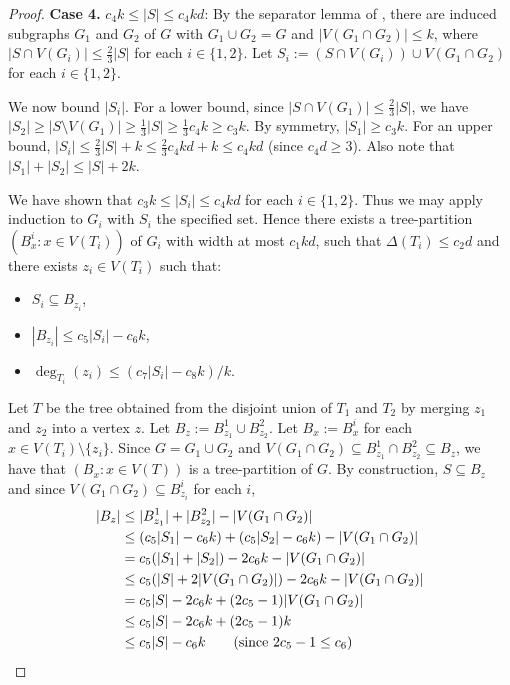 \begin{proof}
\textbf{Case 4.} $c_4 k \leq |S|\leq c_4kd$: By the separator lemma of \citet[(2.6)]{RS-II}, there are induced subgraphs $G_1$ and $G_2$ of $G$ with $G_1\cup G_2=G$ and $|V(G_1\cap G_2)|\leq k$, where $|S\cap V(G_i)|\leq \frac23 |S|$ for each $i\in\{1,2\}$. Let $S_i := (S\cap V(G_i))\cup V(G_1\cap G_2)$ for each $i\in\{1,2\}$.

We now bound $|S_i|$. For a lower bound, since $|S\cap V(G_1)|\leq \frac23 |S|$, we have $|S_2|\geq |S\setminus V(G_1)|\geq \frac13 |S| \geq \frac13 c_4k \geq c_3k $. By symmetry, $|S_1|\geq  c_3k $. For an upper bound, $|S_i|\leq\frac23 |S| + k \leq \frac23 c_4kd + k \leq c_4kd$ (since $c_4d\geq 3$). Also note that $|S_1|+|S_2|\leq |S|+2k$.

We have shown that $c_3k \leq |S_i|\leq c_4kd$ for each $i\in\{1,2\}$. Thus we may apply induction to $G_i$ with $S_i$ the specified set. Hence there exists a tree-partition $(B^i_x:x\in V(T_i))$ of $G_i$ with width at most $c_1 kd$, such that $\Delta(T_i)\leq c_2d$ and there exists $z_i\in V(T_i)$ such that:
\begin{itemize}
    \item $S_i\subseteq B_{z_i}$, 
    \item $|B_{z_i}|\leq c_5|S_i|-c_6k$,
    \item $\deg_{T_i}(z_i)\leq ( c_7 |S_i| - c_8 k)/k$.
\end{itemize}
Let $T$ be the tree obtained from the disjoint union of $T_1$ and $T_2$ by merging $z_1$ and $z_2$ into a vertex $z$. Let $B_z:= B^1_{z_1}\cup B^2_{z_2}$. Let $B_x:= B^i_x$ for each $x\in V(T_i)\setminus\{z_i\}$. Since $G=G_1\cup G_2$ and $V(G_1\cap G_2)\subseteq B^1_{z_1}\cap B^2_{z_2} \subseteq B_z$, we have that $(B_x:x\in V(T))$ is a tree-partition of $G$. 
By construction, $S\subseteq B_z$ and since $V(G_1\cap G_2)\subseteq B^i_{z_i}$ for each $i$, 
\begin{align*}
    |B_z| 
    & \leq |B^1_{z_1}|+|B^2_{z_2}| - |V(G_1\cap G_2)|\\
    & \leq (c_5|S_1|-c_6k) +  (c_5|S_2|-c_6k) - |V(G_1\cap G_2)|\\
    & = c_5( |S_1|+ |S_2|) -2c_6k - |V(G_1\cap G_2)|\\
    & \leq c_5( |S| + 2|V(G_1\cap G_2)| ) -2c_6k - |V(G_1\cap G_2)|\\
    & = c_5 |S|  -2c_6k + (2c_5-1) |V(G_1\cap G_2)|\\
    & \leq c_5 |S|  -2c_6k + (2c_5-1) k\\
    & \leq c_5|S| - c_6 k\qquad \text{(since $ 2c_5-1 \leq c_6$)}\\

\end{align*}
\end{proof}
